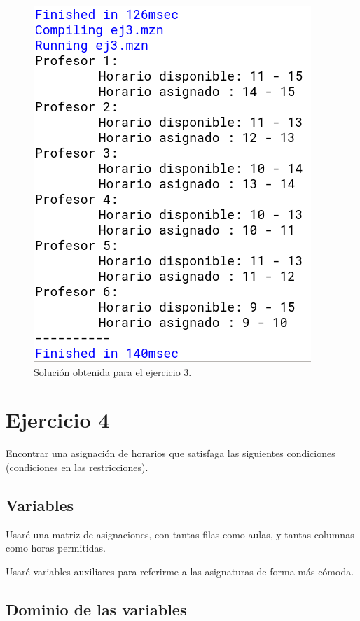 \documentclass[11pt, spanish]{article}
\begin{document}
\begin{figure}[H]
  \centering
      \includegraphics[scale = 0.30]{sol3.png}
 		 \caption{Solución obtenida para el ejercicio 3.}
  		\label{fig:ej3}

\end{figure}

\section{Ejercicio 4}
Encontrar una asignación de horarios que satisfaga las siguientes condiciones (condiciones en las restricciones).

\subsection{Variables}

Usaré una matriz de asignaciones, con tantas filas como aulas, y tantas columnas como horas permitidas.

Usaré variables auxiliares para referirme a las asignaturas de forma más cómoda.

\subsection{Dominio de las variables}
\end{document}
